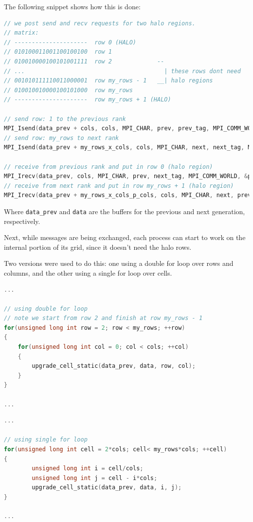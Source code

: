 \documentclass{report}
\begin{document}
\pagebreak
The following snippet shows how this is done:
\begin{lstlisting}[language=C++]
// we post send and recv requests for two halo regions.
// matrix: 
// ---------------------  row 0 (HALO)
// 010100011001100100100  row 1
// 010010000100101001111  row 2             --
// ...                                        | these rows dont need 
// 001010111110011000001  row my_rows - 1   __| halo regions
// 010010010000100101000  row my_rows
// ---------------------  row my_rows + 1 (HALO)

// send row: 1 to the previous rank
MPI_Isend(data_prev + cols, cols, MPI_CHAR, prev, prev_tag, MPI_COMM_WORLD, &prev_send_request);
// send row: my_rows to next rank
MPI_Isend(data_prev + my_rows_x_cols, cols, MPI_CHAR, next, next_tag, MPI_COMM_WORLD, &next_send_request);

// receive from previous rank and put in row 0 (halo region)
MPI_Irecv(data_prev, cols, MPI_CHAR, prev, next_tag, MPI_COMM_WORLD, &prev_recv_request);
// receive from next rank and put in row my_rows + 1 (halo region)
MPI_Irecv(data_prev + my_rows_x_cols_p_cols, cols, MPI_CHAR, next, prev_tag, MPI_COMM_WORLD, &next_recv_request);
\end{lstlisting}

Where \texttt{data\_prev} and \texttt{data} are the buffers for the previous 
and next generation, respectively. 

Next, while messages are being exchanged, each process can start to work on the internal portion of 
its grid, since it doesn't need the halo rows.

Two versions were used to do this: one using a double for loop over rows and columns, 
and the other using a single for loop over cells. 
\begin{lstlisting}[language=C++]
... 

// using double for loop
// note we start from row 2 and finish at row my_rows - 1
for(unsigned long int row = 2; row < my_rows; ++row)
{
    for(unsigned long int col = 0; col < cols; ++col)
    {
        upgrade_cell_static(data_prev, data, row, col);
    }
}

...
\end{lstlisting}

\begin{lstlisting}[language=C++]
...

// using single for loop
for(unsigned long int cell = 2*cols; cell< my_rows*cols; ++cell)
{
        unsigned long int i = cell/cols;
        unsigned long int j = cell - i*cols;
        upgrade_cell_static(data_prev, data, i, j);
}

...
\end{lstlisting}
\end{document}
